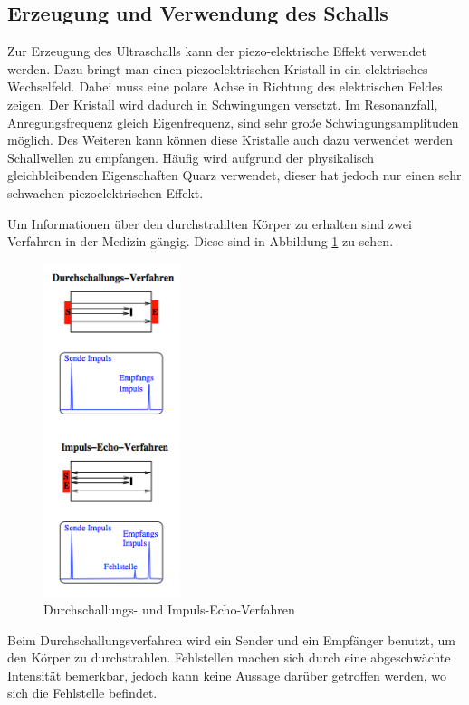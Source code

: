 \subsection{Erzeugung und Verwendung des Schalls}
Zur Erzeugung des Ultraschalls kann der piezo-elektrische Effekt verwendet werden.
Dazu bringt man einen piezoelektrischen Kristall in ein elektrisches Wechselfeld.
Dabei muss eine polare Achse in Richtung des elektrischen Feldes zeigen. Der Kristall
wird dadurch in Schwingungen versetzt. Im Resonanzfall, Anregungsfrequenz gleich
Eigenfrequenz, sind sehr große Schwingungsamplituden möglich.
Des Weiteren kann können diese Kristalle auch dazu verwendet werden Schallwellen zu
empfangen. Häufig wird aufgrund der physikalisch gleichbleibenden Eigenschaften
Quarz verwendet, dieser hat jedoch nur einen sehr schwachen piezoelektrischen
Effekt.

Um Informationen über den durchstrahlten Körper zu erhalten sind zwei Verfahren in
der Medizin gängig. Diese sind in Abbildung \ref{fig:verfahren} zu sehen.
\begin{figure}
  \centering
  \includegraphics[width=4cm]{bilder/verfahren.png}
  \caption{Durchschallungs- und Impuls-Echo-Verfahren \cite{us2}}
  \label{fig:verfahren}
\end{figure}
Beim Durchschallungsverfahren wird ein Sender und ein Empfänger benutzt, um den
Körper zu durchstrahlen. Fehlstellen machen sich durch eine abgeschwächte
Intensität bemerkbar, jedoch kann keine Aussage darüber getroffen werden, wo
sich die Fehlstelle befindet.

